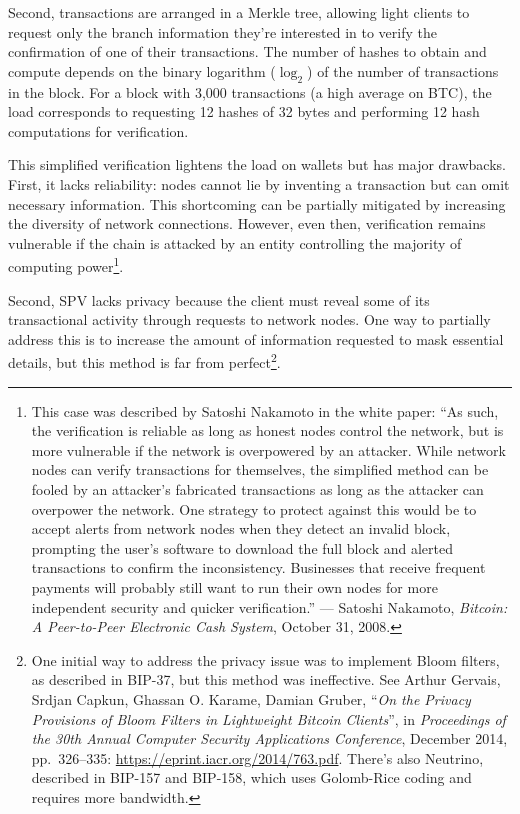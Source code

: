 \documentclass[
  a5paper,
  smalldemyvopaper,10pt,twoside,onecolumn,openright,extrafontsizes,hidelinks]{memoir}
\begin{document}
Second, transactions are arranged in a Merkle tree, allowing light
clients to request only the branch information they're interested in to
verify the confirmation of one of their transactions. The number of
hashes to obtain and compute depends on the binary logarithm
(\(\log_{2}\)) of the number of transactions in the block. For a block
with 3,000 transactions (a high average on BTC), the load corresponds to
requesting 12 hashes of 32 bytes and performing 12 hash computations for
verification.

This simplified verification lightens the load on wallets but has major
drawbacks. First, it lacks reliability: nodes cannot lie by inventing a
transaction but can omit necessary information. This shortcoming can be
partially mitigated by increasing the diversity of network connections.
However, even then, verification remains vulnerable if the chain is
attacked by an entity controlling the majority of computing
power\footnote{This case was described by Satoshi Nakamoto in the white
  paper: ``As such, the verification is reliable as long as honest nodes
  control the network, but is more vulnerable if the network is
  overpowered by an attacker. While network nodes can verify
  transactions for themselves, the simplified method can be fooled by an
  attacker's fabricated transactions as long as the attacker can
  overpower the network. One strategy to protect against this would be
  to accept alerts from network nodes when they detect an invalid block,
  prompting the user's software to download the full block and alerted
  transactions to confirm the inconsistency. Businesses that receive
  frequent payments will probably still want to run their own nodes for
  more independent security and quicker verification.'' --- Satoshi
  Nakamoto, \emph{Bitcoin: A Peer-to-Peer Electronic Cash System},
  October 31, 2008.}.

Second, SPV lacks privacy because the client must reveal some of its
transactional activity through requests to network nodes. One way to
partially address this is to increase the amount of information
requested to mask essential details, but this method is far from
perfect\footnote{One initial way to address the privacy issue was to
  implement Bloom filters, as described in BIP-37, but this method was
  ineffective. See Arthur Gervais, Srdjan Capkun, Ghassan O. Karame,
  Damian Gruber, ``\emph{On the Privacy Provisions of Bloom Filters in
  Lightweight Bitcoin Clients}'', in \emph{Proceedings of the 30th
  Annual Computer Security Applications Conference}, December 2014,
  pp.~326--335: \url{https://eprint.iacr.org/2014/763.pdf}. There's also
  Neutrino, described in BIP-157 and BIP-158, which uses Golomb-Rice
  coding and requires more bandwidth.}.
\end{document}
